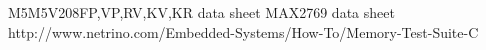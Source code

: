 \begin{thebibliography}{99}


 M5M5V208FP,VP,RV,KV,KR data sheet
 MAX2769 data sheet
 http://www.netrino.com/Embedded-Systems/How-To/Memory-Test-Suite-C



\end{thebibliography}
